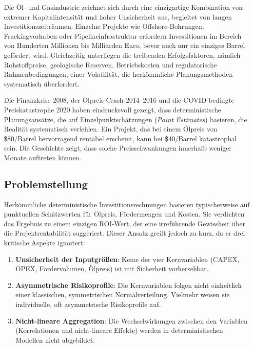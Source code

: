 \documentclass[11pt,a4paper]{article}
\begin{document}
Die Öl- und Gasindustrie zeichnet sich durch eine einzigartige Kombination von extremer Kapitalintensität und hoher Unsicherheit aus, begleitet von langen Investitionszeiträumen. Einzelne Projekte wie Offshore-Bohrungen, Frackingvorhaben oder Pipelineinfrastruktur erfordern Investitionen im Bereich von Hunderten Millionen bis Milliarden Euro, bevor auch nur ein einziges Barrel gefördert wird. Gleichzeitig unterliegen die treibenden Erfolgsfaktoren, nämlich Rohstoffpreise, geologische Reserven, Betriebskosten und regulatorische Rahmenbedingungen, einer Volatilität, die herkömmliche Planungsmethoden systematisch überfordert.

Die Finanzkrise 2008, der Ölpreis-Crash 2014–2016 und die COVID-bedingte Preiskatastrophe 2020 haben eindrucksvoll gezeigt, dass deterministische Planungsansätze, die auf Einzelpunktschätzungen (\textit{Point Estimates}) basieren, die Realität systematisch verfehlen. Ein Projekt, das bei einem Ölpreis von \$80/Barrel hervorragend rentabel erscheint, kann bei \$40/Barrel katastrophal sein. Die Geschichte zeigt, dass solche Preisschwankungen innerhalb weniger Monate auftreten können.

\subsection{Problemstellung}

Herkömmliche deterministische Investitionsrechnungen basieren typischerweise auf punktuellen Schätzwerten für Ölpreis, Fördermengen und Kosten. Sie verdichten das Ergebnis zu einem einzigen ROI-Wert, der eine irreführende Gewissheit über die Projektrentabilität suggeriert. Dieser Ansatz greift jedoch zu kurz, da er drei kritische Aspekte ignoriert:

\begin{enumerate}[label=\arabic*., itemsep=4pt]
  \item \textbf{Unsicherheit der Inputgrößen}: Keine der vier Kernvariablen (CAPEX, OPEX, Fördervolumen, Ölpreis) ist mit Sicherheit vorhersehbar.
  \item \textbf{Asymmetrische Risikoprofile}: Die Kernvariablen folgen nicht einheitlich einer klassischen, symmetrischen Normalverteilung. Vielmehr weisen sie individuelle, oft asymmetrische Risikoprofile auf.
  \item \textbf{Nicht-lineare Aggregation}: Die Wechselwirkungen zwischen den Variablen (Korrelationen und nicht-lineare Effekte) werden in deterministischen Modellen nicht abgebildet.
\end{enumerate}\newpage
\end{document}
